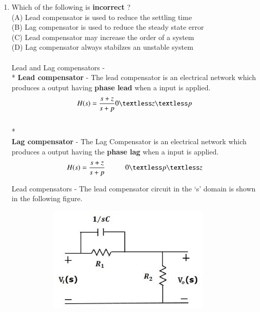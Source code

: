 \begin{enumerate}[label=\thesection.\arabic*.,ref=\thesection.\theenumi]
\item Which of the following is \textbf{incorrect} ?\\
(A) Lead compensator is used to reduce the settling time\\
(B) Lag compensator is used to reduce the steady state error\\
(C) Lead compensator may increase the order of a system\\
(D) Lag compensator always stabilzes an unstable system\\
\\
\solution Lead and Lag compensators - 
\\* \textbf{Lead compensator } - The lead compensator is an electrical network which produces a output having \textbf{phase lead} when a input is applied. 
\\
\begin{equation}
H(s) = \frac{s+z}{s+p}   0 \textless z \textless p
\centering
\end{equation}
\\* \textbf{\\Lag compensator} - The Lag Compensator is an electrical network which produces a  output having the \textbf{phase lag} when a input is applied.
\begin{equation}
H(s) = \frac{s+z}{s+p}  \hspace{1cm} 0 \textless p \textless z
\centering
\end{equation}


Lead compensators - 
The lead compensator circuit in the ‘s’ domain is shown in the following figure.
 
\begin{figure}[h]
 
\begin{subfigure}{0.5\textwidth}
\includegraphics[width=0.9\linewidth, height=5cm ,inner]{./figs/ee18btech11027/lead_compensator.eps} 
\label{fig:subim1}
\end{subfigure}
\end{figure}



\end{enumerate}
